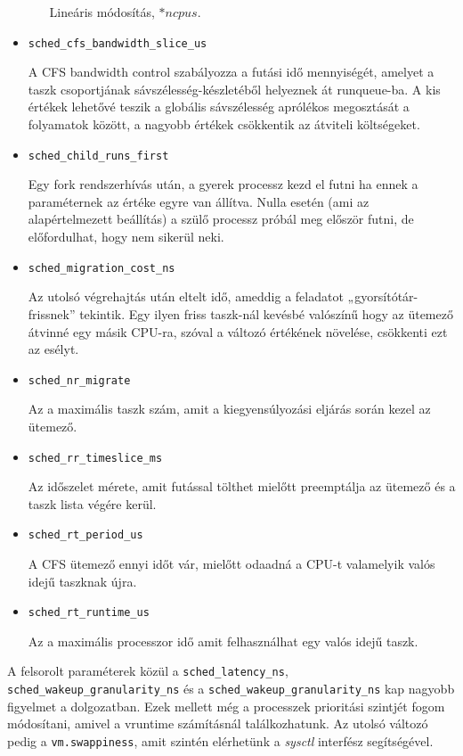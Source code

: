 \begin{itemize}
\begin{enumerate}
Lineáris módosítás, $*ncpus$. 
\end{enumerate}

\item \texttt{sched\_cfs\_bandwidth\_slice\_us}

A CFS bandwidth control szabályozza a futási idő mennyiségét, amelyet a taszk csoportjának sávszélesség-készletéből helyeznek át runqueue-ba. A kis értékek lehetővé teszik a globális sávszélesség aprólékos megosztását a folyamatok között, a nagyobb értékek csökkentik az átviteli költségeket.
\item \texttt{sched\_child\_runs\_first}

Egy fork rendszerhívás után, a gyerek processz kezd el futni ha ennek a paraméternek az értéke egyre van állítva. Nulla esetén (ami az alapértelmezett beállítás) a szülő processz próbál meg először futni, de előfordulhat, hogy nem sikerül neki.

\item \texttt{sched\_migration\_cost\_ns}

Az utolsó végrehajtás után eltelt idő, ameddig a feladatot „gyorsítótár-frissnek” tekintik.
Egy ilyen friss taszk-nál kevésbé valószínű hogy az ütemező átvinné egy másik CPU-ra, szóval a változó értékének növelése, csökkenti ezt az esélyt.

\item \texttt{sched\_nr\_migrate}

Az a maximális taszk szám, amit a kiegyensúlyozási eljárás során kezel az ütemező.

\item \texttt{sched\_rr\_timeslice\_ms}

Az időszelet mérete, amit futással tölthet mielőtt preemptálja az ütemező és a taszk lista végére kerül.

\item \texttt{sched\_rt\_period\_us}

A CFS ütemező ennyi időt vár, mielőtt odaadná a CPU-t valamelyik valós idejű taszknak újra.

\item \texttt{sched\_rt\_runtime\_us}

Az a maximális processzor idő amit felhasználhat egy valós idejű taszk.
\end{itemize}
A felsorolt paraméterek közül a \texttt{sched\_latency\_ns}, \texttt{sched\_wakeup\_granularity\_ns} és a \texttt{sched\_wakeup\_granularity\_ns} kap nagyobb figyelmet a dolgozatban. Ezek mellett még a processzek prioritási szintjét fogom módosítani, amivel a vruntime számításnál találkozhatunk.
Az utolsó változó pedig a \texttt{vm.swappiness}, amit szintén elérhetünk a \textit{sysctl} interfész segítségével. 

